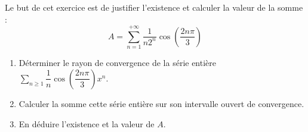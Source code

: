 \documentclass[a4paper,twoside,french,11pt]{VcCours}
\newcommand{\Sum}[2]{\sum_{#1}^{#2}}
\begin{document}
%

\begin{Exercice}[$\bigstar$]{} Le but de cet exercice est de justifier l'existence et calculer la valeur de la somme :  
\[
A=\sum_{n=1}^{+\infty}\dfrac{1}{n2^n}\cos\left(\dfrac{2n\pi}{3}\right)
\]
\begin{enumerate}
\item Déterminer le rayon de convergence de la série entière $\Sum{n \geq 1}{} \dfrac{1}{n}\cos\left(\dfrac{2n\pi}{3}\right)x^n$.
\item Calculer la somme cette série entière sur son intervalle ouvert de convergence.
\item En déduire l'existence et la valeur de $A$.
\end{enumerate}
\end{Exercice}
\end{document}
